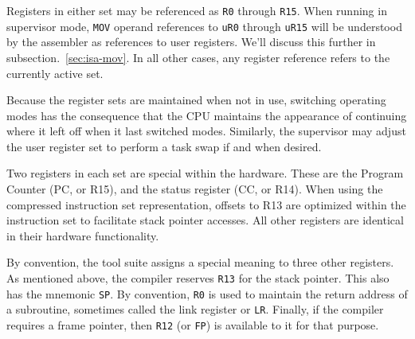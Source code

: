 \documentclass{gqtekspec}
\begin{document}
Registers in either set may be referenced as {\tt R0} through {\tt R15}.
When running in supervisor mode, {\tt MOV} operand references to {\tt uR0}
through {\tt uR15} will be understood by the assembler as references to
user registers.  We'll discuss this further in subsection.~\ref{sec:isa-mov}.
In all other cases, any register reference refers to the currently active set.

Because the register sets are maintained when not in use, switching operating
modes has the consequence that the CPU maintains the appearance of continuing
where it left off when it last switched modes.  Similarly, the supervisor
may adjust the user register set to perform a task swap if and when desired.

Two registers in each set are special within the hardware.  These are the
Program Counter (PC, or R15), and the status register (CC, or R14).  When
using the compressed instruction set representation, offsets to R13 are
optimized within the instruction set to facilitate stack pointer accesses.
All other registers are identical in their hardware functionality.

By convention, the tool suite assigns a special meaning to three other
registers.  As mentioned above, the compiler reserves {\tt R13} for the
stack pointer.  This also has the mnemonic {\tt SP}.  By convention, {\tt R0}
is used to maintain the return address of a subroutine, sometimes called the
link register or {\tt LR}.  Finally, if the compiler requires a frame pointer,
then {\tt R12} (or {\tt FP}) is available to it for that purpose.
\end{document}
